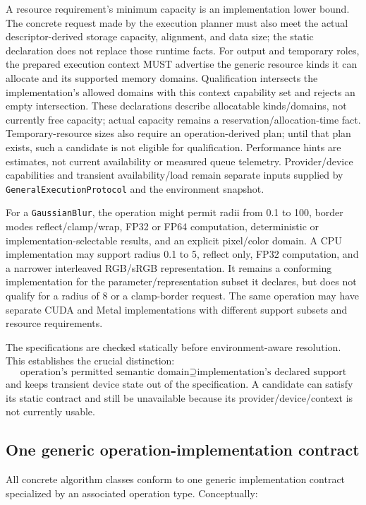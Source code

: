 \documentclass[11pt,a4paper,oneside]{article}
\begin{document}
A resource requirement's minimum capacity is an implementation lower bound. The concrete request made by the execution planner must also meet the actual descriptor-derived storage capacity, alignment, and data size; the static declaration does not replace those runtime facts. For output and temporary roles, the prepared execution context MUST advertise the generic resource kinds it can allocate and its supported memory domains. Qualification intersects the implementation's allowed domains with this context capability set and rejects an empty intersection. These declarations describe allocatable kinds/domains, not currently free capacity; actual capacity remains a reservation/allocation-time fact. Temporary-resource sizes also require an operation-derived plan; until that plan exists, such a candidate is not eligible for qualification. Performance hints are estimates, not current availability or measured queue telemetry. Provider/device capabilities and transient availability/load remain separate inputs supplied by \texttt{GeneralExecutionProtocol} and the environment snapshot.

For a \texttt{GaussianBlur}, the operation might permit radii from 0.1 to 100, border modes reflect/clamp/wrap, FP32 or FP64 computation, deterministic or implementation-selectable results, and an explicit pixel/color domain. A CPU implementation may support radius 0.1 to 5, reflect only, FP32 computation, and a narrower interleaved RGB/sRGB representation. It remains a conforming implementation for the parameter/representation subset it declares, but does not qualify for a radius of 8 or a clamp-border request. The same operation may have separate CUDA and Metal implementations with different support subsets and resource requirements.

The specifications are checked statically before environment-aware resolution. This establishes the crucial distinction:
\[
\text{operation's permitted semantic domain}
\supseteq
\text{implementation's declared support}
\]
and keeps transient device state out of the specification. A candidate can satisfy its static contract and still be unavailable because its provider/device/context is not currently usable.

\subsection{One generic operation-implementation contract}

All concrete algorithm classes conform to one generic implementation contract specialized by an associated operation type. Conceptually:
\end{document}
